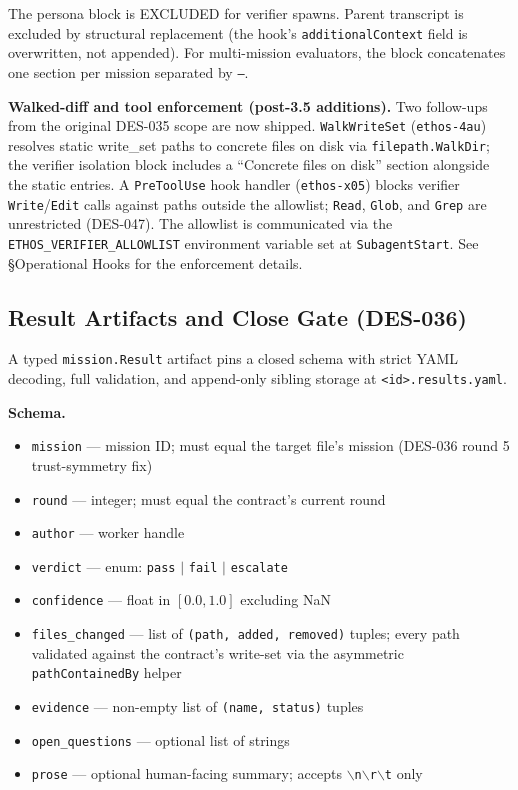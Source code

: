 \documentclass[a4paper,10pt]{article}
\newcommand{\field}[1]{\texttt{#1}}
\newcommand{\fpath}[1]{\texttt{#1}}
\begin{document}
The persona block is EXCLUDED for verifier spawns.  Parent
transcript is excluded by structural replacement (the hook's
\texttt{additionalContext} field is overwritten, not appended).
For multi-mission evaluators, the block concatenates one section
per mission separated by \texttt{---}.

\textbf{Walked-diff and tool enforcement (post-3.5 additions).}
Two follow-ups from the original DES-035 scope are now shipped.
\texttt{WalkWriteSet} (\texttt{ethos-4au}) resolves static
write\_set paths to concrete files on disk via
\texttt{filepath.WalkDir}; the verifier isolation block includes a
``Concrete files on disk'' section alongside the static entries.  A
\texttt{PreToolUse} hook handler (\texttt{ethos-x05}) blocks
verifier \texttt{Write}/\texttt{Edit}
calls against paths outside the allowlist; \texttt{Read},
\texttt{Glob}, and \texttt{Grep} are unrestricted (DES-047).
The allowlist is communicated via the
\texttt{ETHOS\_VERIFIER\_ALLOWLIST} environment variable set at
\texttt{SubagentStart}.  See \S{}Operational Hooks for the
enforcement details.

\subsection{Result Artifacts and Close Gate (DES-036)}

A typed \texttt{mission.Result} artifact pins a closed schema with
strict YAML decoding, full validation, and append-only sibling
storage at \fpath{<id>.results.yaml}.

\textbf{Schema.}

\begin{itemize}
  \item \field{mission} --- mission ID; must equal the target file's
    mission (DES-036 round 5 trust-symmetry fix)
  \item \field{round} --- integer; must equal the contract's current
    round
  \item \field{author} --- worker handle
  \item \field{verdict} --- enum: \texttt{pass} $|$ \texttt{fail}
    $|$ \texttt{escalate}
  \item \field{confidence} --- float in $[0.0, 1.0]$ excluding NaN
  \item \field{files\_changed} --- list of \texttt{(path, added,
    removed)} tuples; every path validated against the contract's
    write-set via the asymmetric \texttt{pathContainedBy} helper
  \item \field{evidence} --- non-empty list of \texttt{(name,
    status)} tuples
  \item \field{open\_questions} --- optional list of strings
  \item \field{prose} --- optional human-facing summary; accepts
    \texttt{$\backslash$n$\backslash$r$\backslash$t} only
\end{itemize}
\end{document}
